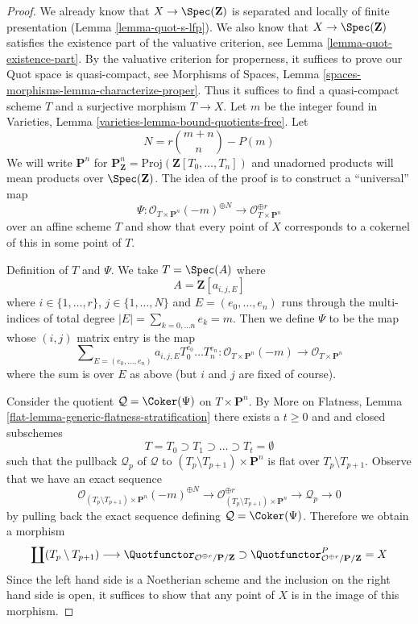 \begin{proof}
We already know that $X \to \Spec(\mathbf{Z})$ is separated and
locally of finite presentation (Lemma \ref{lemma-quot-s-lfp}).
We also know that $X \to \Spec(\mathbf{Z})$ satisfies the
existence part of the valuative criterion, see
Lemma \ref{lemma-quot-existence-part}.
By the valuative criterion for properness, it suffices to
prove our Quot space is quasi-compact, see
Morphisms of Spaces,
Lemma \ref{spaces-morphisms-lemma-characterize-proper}.
Thus it suffices to find a quasi-compact scheme $T$ and a surjective
morphism $T \to X$. Let $m$ be the integer found in
Varieties, Lemma \ref{varieties-lemma-bound-quotients-free}.
Let
$$
N = r{m + n \choose n} - P(m)
$$
We will write $\mathbf{P}^n$ for
$\mathbf{P}^n_\mathbf{Z} = \text{Proj}(\mathbf{Z}[T_0, \ldots, T_n])$
and unadorned products will mean products over $\Spec(\mathbf{Z})$.
The idea of the proof is to construct a ``universal'' map
$$
\Psi :
\mathcal{O}_{T \times \mathbf{P}^n}(-m)^{\oplus N}
\longrightarrow
\mathcal{O}_{T \times \mathbf{P}^n}^{\oplus r}
$$
over an affine scheme $T$ and show that every point of $X$
corresponds to a cokernel of this in some point of $T$.

\medskip\noindent
Definition of $T$ and $\Psi$. We take $T = \Spec(A)$ where
$$
A = \mathbf{Z}[a_{i, j, E}]
$$
where $i \in \{1, \ldots, r\}$, $j \in \{1, \ldots, N\}$
and $E = (e_0, \ldots, e_n)$ runs through the multi-indices
of total degree $|E| = \sum_{k = 0, \ldots n} e_k = m$.
Then we define $\Psi$ to be the map whose $(i, j)$ matrix
entry is the map
$$
\sum\nolimits_{E = (e_0, \ldots, e_n)}
a_{i, j, E} T_0^{e_0} \ldots T_n^{e_n} :
\mathcal{O}_{T \times \mathbf{P}^n}(-m)
\longrightarrow
\mathcal{O}_{T \times \mathbf{P}^n}
$$
where the sum is over $E$ as above (but $i$ and $j$ are fixed of course).

\medskip\noindent
Consider the quotient $\mathcal{Q} = \Coker(\Psi)$ on $T \times \mathbf{P}^n$.
By More on Flatness, Lemma \ref{flat-lemma-generic-flatness-stratification}
there exists a $t \geq 0$ and  and closed subschemes
$$
T = T_0 \supset T_1 \supset \ldots \supset T_t = \emptyset
$$
such that the pullback $\mathcal{Q}_p$ of $\mathcal{Q}$ to
$(T_p \setminus T_{p + 1}) \times \mathbf{P}^n$ is flat over
$T_p \setminus T_{p + 1}$. Observe that we
have an exact sequence
$$
\mathcal{O}_{(T_p \setminus T_{p + 1}) \times \mathbf{P}^n}(-m)^{\oplus N}
\to
\mathcal{O}_{(T_p \setminus T_{p + 1}) \times \mathbf{P}^n}^{\oplus r}
\to
\mathcal{Q}_p
\to
0
$$
by pulling back the exact sequence defining $\mathcal{Q} = \Coker(\Psi)$.
Therefore we obtain a morphism
$$
\coprod (T_p \setminus T_{p + 1})
\longrightarrow
\Quotfunctor_{\mathcal{O}^{\oplus r}/\mathbf{P}/\mathbf{Z}}
\supset
\Quotfunctor^P_{\mathcal{O}^{\oplus r}/\mathbf{P}/\mathbf{Z}} = X
$$
Since the left hand side is a Noetherian scheme and the inclusion
on the right hand side is open, it
suffices to show that any point of $X$ is in the image of this morphism.


\end{proof}
